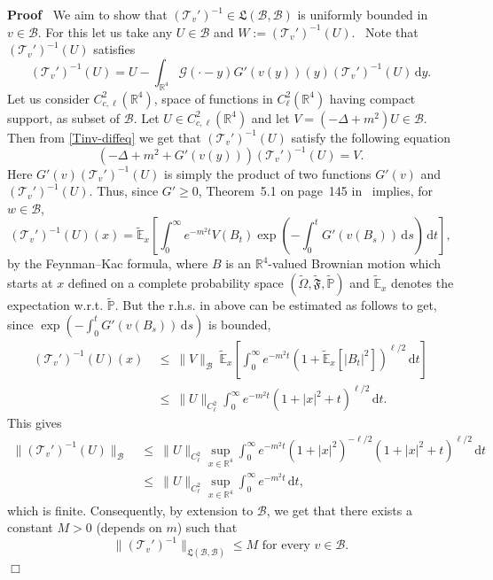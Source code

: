 \documentclass{article}
\newcommand{\assign}{:=}
\newcommand{\mathd}{\mathrm{d}}
\newenvironment{proof}{\noindent\textbf{Proof\ }}{\hspace*{\fill}$\Box$\medskip}
\begin{document}
\begin{proof}
  We aim
  to show that $(\mathcal{T}_v')^{- 1} \in \mathfrak{L} (\mathcal{B},
  \mathcal{B})$ is uniformly bounded in $v \in \mathcal{B}$. For this let us
  take any $U \in \mathcal{B}$ and $W \assign (\mathcal{T}_v')^{- 1} (U)$. \
  Note that $(\mathcal{T}_v')^{- 1} (U)$ satisfies
  \begin{equation}
      (\mathcal{T}_v')^{- 1} (U) = U - \int_{\mathbb{R}^4} \mathcal{G} (\cdot
      - y) G' (v (y)) (y) (\mathcal{T}_v')^{- 1} (U) \, \mathd y.
    \label{Tinv-diffeq}
  \end{equation}
  Let us consider $C_{c, \ell}^2 (\mathbb{R}^4)$, space of functions in
  $C_{\ell}^2 (\mathbb{R}^4)$ having compact support, as subset of
  $\mathcal{B}$. Let $U \in C_{c, \ell}^2 (\mathbb{R}^4)$ and let $V = (-  \Delta + m^2) U \in \mathcal{B}$. Then from \eqref{Tinv-diffeq} we get that
  $(\mathcal{T}_v')^{- 1} (U)$ satisfy the following equation
  \[ 
       (- \Delta + m^2 + G' (v (y))) (\mathcal{T}_v')^{- 1} (U) = V.
     \]
  Here $G' (v) (\mathcal{T}_v')^{- 1} (U)$ is simply the product of two
  functions $G' (v)$ and $(\mathcal{T}_v')^{- 1} (U)$. Thus, since $G'
  \geqslant 0$, Theorem~5.1 on page~145 in~{\cite{AF75}} implies, for $w \in
  \mathcal{B}$,
  \[ 
       (\mathcal{T}_v')^{- 1} (U) (x) = \tilde{\mathbb{E}}_x \left[
       \int_0^{\infty} e^{- m^2 t} V (B_t) \exp \left( - \int_0^t G' (v (B_s)) \,  \mathd s \right)\,  \mathd t \right],
      \]
  by the Feynman--Kac formula, where $B$ is an $\mathbb{R}^4$-valued Brownian
  motion which starts at $x$ defined on a complete probability space
  $(\tilde{\Omega}, \tilde{\mathfrak{F}}, \tilde{\mathbb{P}})$ and
  $\tilde{\mathbb{E}}_x$ denotes the expectation w.r.t. $\tilde{\mathbb{P}}$.
  But the r.h.s. in above can be estimated as follows to get, since $\exp \left(
  - \int_0^t G' (v (B_s)) \, \mathd s \right)$ is bounded,
  \begin{align*}
    (\mathcal{T}_v')^{- 1} (U) (x)  & ~\leq~ \| V \|_{\mathcal{B}}~
       \tilde{\mathbb{E}}_x \left[ \int_0^{\infty} e^{- m^2 t} (1 + \tilde{\mathbb{E}}_x [| B_t |^2])^{\ell / 2} \, \mathd t \right]\\
       & ~\leq~ \| U \|_{C_{\ell}^2 } \int_0^{\infty} e^{-
       m^2 t} (1 + | x |^2 + t)^{\ell / 2} \, \mathd t.  
  \end{align*}
  This gives
  \begin{align*}
    {\| (\mathcal{T}_v')^{- 1} (U) \|_{\mathcal{B}}}  & ~\leq~ \| U
       \|_{C_{\ell}^2} \sup_{x \in \mathbb{R}^4}
       \int_0^{\infty} e^{- m^2 t} (1 + | x |^2)^{- \ell / 2} (1 + | x |^2 +
       t)^{\ell / 2} \, \mathd t\\
       & ~\leq~ \| U \|_{C_{\ell}^2} \sup_{x \in
       \mathbb{R}^4} \int_0^{\infty} e^{- m^2 t} \, \mathd t,   
  \end{align*}
  which is finite. Consequently, by extension to $\mathcal{B}$, we get that
  there exists a constant $M > 0$ (depends on $m$) such that
  \[ 
       \| (\mathcal{T}_v')^{- 1} \|_{\mathfrak{L} (\mathcal{B}, \mathcal{B})}
       \leqslant M \textrm{ for every } v \in \mathcal{B}.
     \]
\end{proof}
\end{document}
